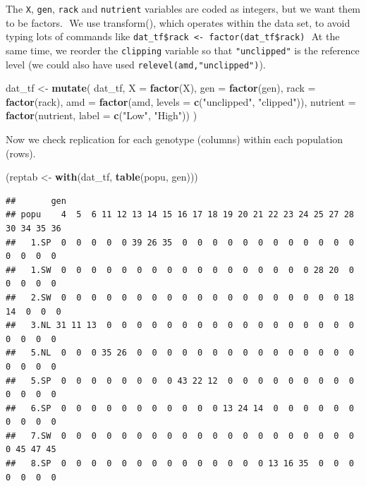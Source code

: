 \documentclass[
  12pt,
]{book}
\newenvironment{Shaded}{\begin{snugshade}}{\end{snugshade}}
\newcommand{\DataTypeTok}[1]{\textcolor[rgb]{0.13,0.29,0.53}{#1}}
\newcommand{\KeywordTok}[1]{\textcolor[rgb]{0.13,0.29,0.53}{\textbf{#1}}}
\newcommand{\NormalTok}[1]{#1}
\newcommand{\StringTok}[1]{\textcolor[rgb]{0.31,0.60,0.02}{#1}}
\begin{document}
The \texttt{X}, \texttt{gen}, \texttt{rack} and \texttt{nutrient} variables are coded as integers, but we want them to be factors.
 We use transform(), which operates within the data set, to avoid typing lots of commands like \texttt{dat\_tf\$rack\ \textless{}-\ factor(dat\_tf\$rack)}
 At the same time, we reorder the \texttt{clipping} variable so that \texttt{"unclipped"} is the reference level (we could also have used \texttt{relevel(amd,"unclipped")}).

\begin{Shaded}
\begin{Highlighting}[]
\NormalTok{dat\_tf \textless{}{-}}\StringTok{ }\KeywordTok{mutate}\NormalTok{(}
\NormalTok{  dat\_tf,}
  \DataTypeTok{X =} \KeywordTok{factor}\NormalTok{(X),}
  \DataTypeTok{gen =} \KeywordTok{factor}\NormalTok{(gen),}
  \DataTypeTok{rack =} \KeywordTok{factor}\NormalTok{(rack),}
  \DataTypeTok{amd =} \KeywordTok{factor}\NormalTok{(amd, }\DataTypeTok{levels =} \KeywordTok{c}\NormalTok{(}\StringTok{"unclipped"}\NormalTok{, }\StringTok{"clipped"}\NormalTok{)),}
  \DataTypeTok{nutrient =} \KeywordTok{factor}\NormalTok{(nutrient, }\DataTypeTok{label =} \KeywordTok{c}\NormalTok{(}\StringTok{"Low"}\NormalTok{, }\StringTok{"High"}\NormalTok{))}
\NormalTok{)}
\end{Highlighting}
\end{Shaded}

Now we check replication for each genotype (columns) within each population (rows).

\begin{Shaded}
\begin{Highlighting}[]
\NormalTok{(reptab \textless{}{-}}\StringTok{ }\KeywordTok{with}\NormalTok{(dat\_tf, }\KeywordTok{table}\NormalTok{(popu, gen)))}
\end{Highlighting}
\end{Shaded}

\begin{verbatim}
##       gen
## popu    4  5  6 11 12 13 14 15 16 17 18 19 20 21 22 23 24 25 27 28 30 34 35 36
##   1.SP  0  0  0  0  0 39 26 35  0  0  0  0  0  0  0  0  0  0  0  0  0  0  0  0
##   1.SW  0  0  0  0  0  0  0  0  0  0  0  0  0  0  0  0  0 28 20  0  0  0  0  0
##   2.SW  0  0  0  0  0  0  0  0  0  0  0  0  0  0  0  0  0  0  0 18 14  0  0  0
##   3.NL 31 11 13  0  0  0  0  0  0  0  0  0  0  0  0  0  0  0  0  0  0  0  0  0
##   5.NL  0  0  0 35 26  0  0  0  0  0  0  0  0  0  0  0  0  0  0  0  0  0  0  0
##   5.SP  0  0  0  0  0  0  0  0 43 22 12  0  0  0  0  0  0  0  0  0  0  0  0  0
##   6.SP  0  0  0  0  0  0  0  0  0  0  0 13 24 14  0  0  0  0  0  0  0  0  0  0
##   7.SW  0  0  0  0  0  0  0  0  0  0  0  0  0  0  0  0  0  0  0  0  0 45 47 45
##   8.SP  0  0  0  0  0  0  0  0  0  0  0  0  0  0 13 16 35  0  0  0  0  0  0  0
\end{verbatim}
\end{document}
